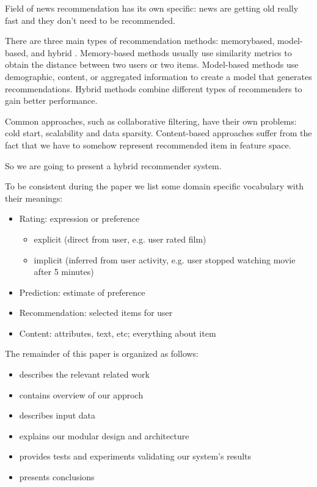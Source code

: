 \documentclass{article}
\begin{document}
    Field of news recommendation has its own specific: news are getting old really fast and they don't need to be recommended.

     There are three main types of recommendation methods: memorybased, model-based, and hybrid \citep{survey}. Memory-based methods \citep{memory} usually use similarity metrics to obtain the distance between two users or two items. Model-based methods use demographic, content, or aggregated information to create a model that generates recommendations. Hybrid \citep{combining} methods combine different types of recommenders to gain better performance.

    Common approaches, such as collaborative filtering, have their own problems: cold start, scalability and data sparsity. Content-based approaches suffer from the fact that we have to somehow represent recommended item in feature space.

    So we are going to present a hybrid recommender system.
    
    To be consistent during the paper we list some domain specific vocabulary with their meanings:

        \begin{itemize}
            \item Rating: expression or preference

                \begin{itemize}
                    \item explicit (direct from user, e.g. user rated film)
                    \item implicit (inferred from user activity, e.g. user stopped watching movie after 5 minutes)
                \end{itemize}
            \item Prediction: estimate of preference
            \item Recommendation: selected items for user
            \item Content: attributes, text, etc; everything about item
        \end{itemize}


    The remainder of this paper is organized as follows:
    
        \begin{itemize}
            \item {} describes the relevant related work
            \item {} contains overview of our approch
            \item {} describes input data
            \item {} explains our modular design and architecture
            \item {} provides tests and experiments validating
our system’s results
            \item {} presents conclusions
        \end{itemize}
\end{document}
